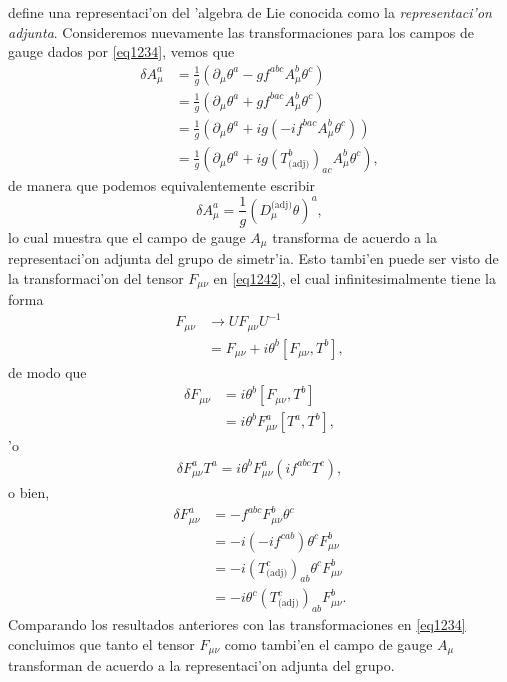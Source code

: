define una representaci'on del 'algebra de Lie conocida como la \textit{representaci'on adjunta}.
Consideremos nuevamente las transformaciones para los campos de gauge dados por \eqref{eq1234}, vemos que
\begin{equation}
\begin{aligned}
\delta A^a _\mu&=\frac{1}{g}(\partial_\mu \theta^a-gf^{abc}A^b_\mu \theta^c) \\
& =\frac{1}{g}(\partial_\mu \theta^a+gf^{bac}A^b_\mu \theta^c) \\
&=\frac{1}{g}(\partial_\mu \theta^a+ig(-if^{bac}A^b_\mu \theta^c)) \\
&=\frac{1}{g}(\partial_\mu \theta^a+ig(T^b_{\text{(adj)}})_{ac}A^b_\mu \theta^c),
\end{aligned}
\end{equation}
de manera que podemos equivalentemente escribir
\begin{equation}
\delta A^a _\mu =\frac{1}{g}(D_\mu ^{\text{(adj)}}\theta)^a, 
\end{equation}
lo cual muestra que el campo de gauge $A_\mu$ transforma de acuerdo a la representaci'on adjunta del grupo de simetr'ia. Esto tambi'en puede ser visto de la transformaci'on del tensor $F_{\mu\nu}$ en \eqref{eq1242}, el cual infinitesimalmente tiene la forma
\begin{equation}
\begin{aligned}
F_{\mu\nu}&\rightarrow UF_{\mu\nu}U^{-1} \\
&=F_{\mu\nu}+i\theta^b[F_{\mu\nu},T^b],
\end{aligned}
\end{equation}
de modo que
\begin{equation}
\begin{aligned}
\delta F_{\mu\nu}&=i\theta^b [F_{\mu\nu},T^b] \\
&=i\theta^b F^a_{\mu\nu}[T^a,T^b],
\end{aligned}
\end{equation}
'o
\begin{equation}
\begin{aligned}
\delta F^a_{\mu\nu}T^a=i\theta^b F^a_{\mu\nu}(if^{abc}T^c), 
\end{aligned}
\end{equation}
o bien,
\begin{equation}
\begin{aligned}
\delta F^a_{\mu\nu}&= -f^{abc} F^b_{\mu\nu} \theta^c \\
&=-i(-if^{cab})\theta^c F^b_{\mu\nu} \\
&=-i(T^c_{\text{(adj)}})_{ab}\theta^c F^b_{\mu\nu} \\
&=-i\theta^c  (T^c_{\text{(adj)}})_{ab} F^b_{\mu\nu}.
\end{aligned}
\end{equation}
Comparando los resultados anteriores con las transformaciones en \eqref{eq1234} concluimos que tanto el tensor $F_{\mu\nu}$ como tambi'en el campo de gauge $A_\mu$ transforman de acuerdo a la representaci'on adjunta del grupo.